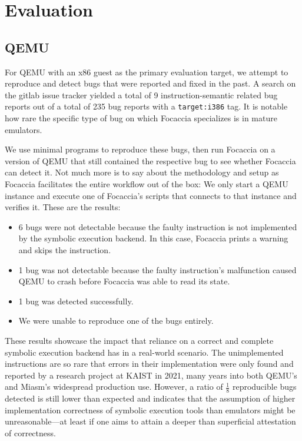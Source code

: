 \chapter{Evaluation}

\section{QEMU}

For QEMU with an x86 guest as the primary evaluation target, we attempt to reproduce and detect bugs that were reported
and fixed in the past. A search on the gitlab issue tracker yielded a total of 9 instruction-semantic related bug
reports out of a total of 235 bug reports with a \texttt{target:i386} tag. It is notable how rare the specific type of
bug on which Focaccia specializes is in mature emulators.

We use minimal programs to reproduce these bugs, then run Focaccia on a version of QEMU that still contained the
respective bug to see whether Focaccia can detect it. Not much more is to say about the methodology and setup as
Focaccia facilitates the entire workflow out of the box: We only start a QEMU instance and execute one of Focaccia's
scripts that connects to that instance and verifies it. These are the results:

\begin{itemize}
    \item 6 bugs were not detectable because the faulty instruction is not implemented by the symbolic execution
        backend. In this case, Focaccia prints a warning and skips the instruction.
    \item 1 bug was not detectable because the faulty instruction's malfunction caused QEMU to crash before Focaccia was
        able to read its state.
    \item 1 bug was detected successfully.
    \item We were unable to reproduce one of the bugs entirely.
\end{itemize}

These results showcase the impact that reliance on a correct and complete symbolic execution backend has in a real-world
scenario. The unimplemented instructions are so rare that errors in their implementation were only found and reported by
a research project at KAIST in 2021, many years into both QEMU's and Miasm's widespread production use. However, a ratio
of $\frac{1}{8}$ reproducible bugs detected is still lower than expected and indicates that the assumption of higher
implementation correctness of symbolic execution tools than emulators might be unreasonable---at least if one aims to
attain a deeper than superficial attestation of correctness.

